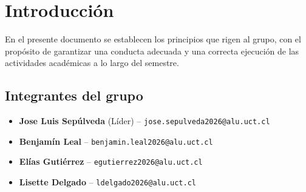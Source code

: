 \section{Introducción}

En el presente documento se establecen los principios que rigen al grupo, con el propósito de garantizar una conducta adecuada y una correcta ejecución de las actividades académicas a lo largo del semestre.

\subsection{Integrantes del grupo}

\begin{itemize}
    \item \textbf{Jose Luis Sepúlveda} (Líder) -- \texttt{jose.sepulveda2026@alu.uct.cl}
    \item \textbf{Benjamín Leal} -- \texttt{benjamin.leal2026@alu.uct.cl}
    \item \textbf{Elías Gutiérrez} -- \texttt{egutierrez2026@alu.uct.cl}
    \item \textbf{Lisette Delgado} -- \texttt{ldelgado2026@alu.uct.cl}
\end{itemize}
